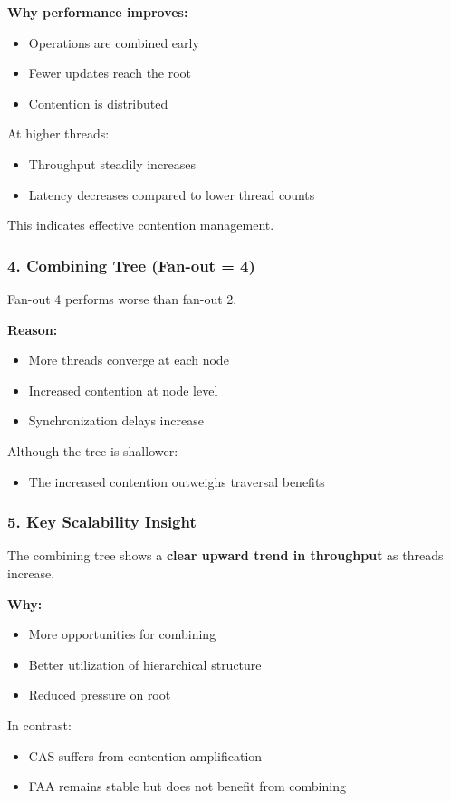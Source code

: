 \documentclass[11pt,a4paper]{article}
\begin{document}
\textbf{Why performance improves:}
\begin{itemize}
    \item Operations are combined early
    \item Fewer updates reach the root
    \item Contention is distributed
\end{itemize}
At higher threads:
\begin{itemize}
    \item Throughput steadily increases
    \item Latency decreases compared to lower thread counts
\end{itemize}
This indicates effective contention management.

\subsubsection*{4. Combining Tree (Fan-out = 4)}

Fan-out 4 performs worse than fan-out 2.

\textbf{Reason:}
\begin{itemize}
    \item More threads converge at each node
    \item Increased contention at node level
    \item Synchronization delays increase
\end{itemize}
Although the tree is shallower:
\begin{itemize}
    \item The increased contention outweighs traversal benefits
\end{itemize}

\subsubsection*{5. Key Scalability Insight}

The combining tree shows a \textbf{clear upward trend in throughput} as threads increase.

\textbf{Why:}
\begin{itemize}
    \item More opportunities for combining
    \item Better utilization of hierarchical structure
    \item Reduced pressure on root
\end{itemize}
In contrast:
\begin{itemize}
    \item CAS suffers from contention amplification
    \item FAA remains stable but does not benefit from combining
\end{itemize}
\end{document}
